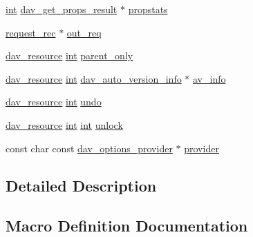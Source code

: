 \begin{DoxyCompactItemize}
\item 
\hyperlink{pcre_8txt_a42dfa4ff673c82d8efe7144098fbc198}{int} \hyperlink{structdav__get__props__result}{dav\+\_\+get\+\_\+props\+\_\+result} $\ast$ \hyperlink{group__MOD__DAV_ga943fae2396117a775d57830a22f85ddb}{propstats}
\item 
\hyperlink{structrequest__rec}{request\+\_\+rec} $\ast$ \hyperlink{group__MOD__DAV_ga88f1c33cbfbc8da7746840cffd827b59}{out\+\_\+req}
\item 
\hyperlink{structdav__resource}{dav\+\_\+resource} \hyperlink{pcre_8txt_a42dfa4ff673c82d8efe7144098fbc198}{int} \hyperlink{group__MOD__DAV_ga77494802fe3304b88fe3d4a28ccc7a46}{parent\+\_\+only}
\item 
\hyperlink{structdav__resource}{dav\+\_\+resource} \hyperlink{pcre_8txt_a42dfa4ff673c82d8efe7144098fbc198}{int} \hyperlink{structdav__auto__version__info}{dav\+\_\+auto\+\_\+version\+\_\+info} $\ast$ \hyperlink{group__MOD__DAV_ga9b9e3731681a56e2bf4dec3e3fb956a6}{av\+\_\+info}
\item 
\hyperlink{structdav__resource}{dav\+\_\+resource} \hyperlink{pcre_8txt_a42dfa4ff673c82d8efe7144098fbc198}{int} \hyperlink{group__MOD__DAV_gae0dedc57fbbe42ccdabee641dd43f047}{undo}
\item 
\hyperlink{structdav__resource}{dav\+\_\+resource} \hyperlink{pcre_8txt_a42dfa4ff673c82d8efe7144098fbc198}{int} \hyperlink{pcre_8txt_a42dfa4ff673c82d8efe7144098fbc198}{int} \hyperlink{group__MOD__DAV_gaffa9847fd05b455996e2dcd415f76a13}{unlock}
\item 
const char const \hyperlink{structdav__options__provider}{dav\+\_\+options\+\_\+provider} $\ast$ \hyperlink{group__MOD__DAV_gaf0b2e32aa25087ef77626ce8bb9d7aa4}{provider}
\end{DoxyCompactItemize}


\subsection{Detailed Description}


\subsection{Macro Definition Documentation}
